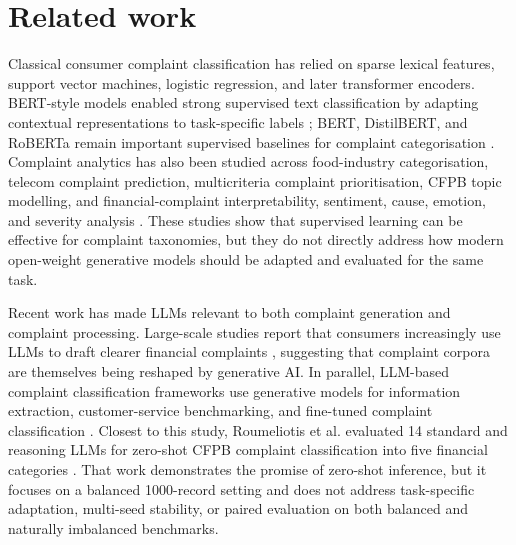 \documentclass{elektr}
\begin{document}
\section{Related work}

Classical consumer complaint classification has relied on sparse lexical features, support vector machines, logistic regression, and later transformer encoders. BERT-style models enabled strong supervised text classification by adapting contextual representations to task-specific labels \cite{devlin2019bert}; BERT, DistilBERT, and RoBERTa remain important supervised baselines for complaint categorisation \cite{devlin2019bert,sanh2019distilbert,liu2019roberta,sy2024beyondbert}. Complaint analytics has also been studied across food-industry categorisation, telecom complaint prediction, multicriteria complaint prioritisation, CFPB topic modelling, and financial-complaint interpretability, sentiment, cause, emotion, and severity analysis \cite{bozyigit2022foodcomplaints,gewaly2024telecomcomplaint,vairetti2024complaintpriority,raju2022cfpbtopic,das2024negative}. These studies show that supervised learning can be effective for complaint taxonomies, but they do not directly address how modern open-weight generative models should be adapted and evaluated for the same task.

Recent work has made LLMs relevant to both complaint generation and complaint processing. Large-scale studies report that consumers increasingly use LLMs to draft clearer financial complaints \cite{shin2025adoption,liang2025widespread}, suggesting that complaint corpora are themselves being reshaped by generative AI. In parallel, LLM-based complaint classification frameworks use generative models for information extraction, customer-service benchmarking, and fine-tuned complaint classification \cite{yuan2024framework,li2025teleeval,gullu2025complaintllm}. Closest to this study, Roumeliotis et al. evaluated 14 standard and reasoning LLMs for zero-shot CFPB complaint classification into five financial categories \cite{roumeliotis2025think}. That work demonstrates the promise of zero-shot inference, but it focuses on a balanced 1000-record setting and does not address task-specific adaptation, multi-seed stability, or paired evaluation on both balanced and naturally imbalanced benchmarks.
\end{document}
